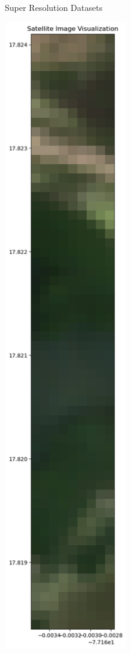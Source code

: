\begin{frame}{Super Resolution Datasets}
\begin{minipage}[b]{0.49\textwidth}
    \end{minipage}%
    \hfill
    \begin{minipage}[b]{0.49\textwidth}
        \centering
        \includegraphics[width=0.4\textwidth,height=0.95\textheight]{images/Sat_tiff.png} \\
    \end{minipage}
\end{frame}


